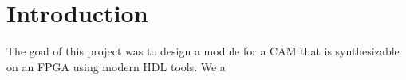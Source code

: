 \section{Introduction}
The goal of this project was to design a module for a CAM that is synthesizable on an FPGA using modern HDL tools. 
We a